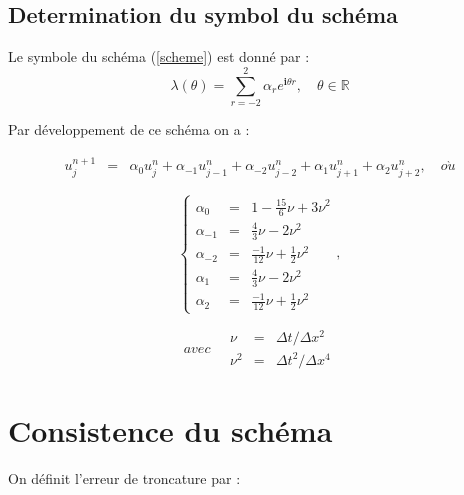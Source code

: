 \documentclass[a4paper,11pt]{article}
\begin{document}
\subsection{Determination du symbol du schéma}

Le symbole du schéma (\ref{scheme}) est donné par :
\begin{equation*}
\lambda(\theta) = \sum \limits_{r=-2}^{2} \alpha_{r} e^{\mathbf{i} \theta r}, \quad \theta \in \mathbb{R}
\end{equation*}

Par développement de ce schéma on a :

\begin{equation*}
    \begin{array}{rcl}
        u^{n+1}_{j} &=& \alpha_{0} u^{n}_{j} + \alpha_{-1} u^{n}_{j-1} + \alpha_{-2} u^{n}_{j-2} + \alpha_{1} u^{n}_{j+1}  + \alpha_{2} u^{n}_{j+2}, \quad o\grave{u}
    \end{array}
\end{equation*}

\begin{equation*}
    \left\{
    \begin{array}{rcl}
        \alpha_{0} &=& 1 - \scriptstyle \frac{15}{6} \nu + 3 \nu^{2} \\
        \alpha_{-1} &=& \scriptstyle \frac{4}{3} \nu - 2 \nu^{2} \\
        \alpha_{-2} &=& \scriptstyle \frac{-1}{12} \nu + \frac{1}{2} \nu^{2} \\
        \alpha_{1} &=& \scriptstyle \frac{4}{3} \nu - 2 \nu^{2} \\
        \alpha_{2} &=& \scriptstyle \frac{-1}{12} \nu + \frac{1}{2} \nu^{2}
    \end{array}
    \right.,
\end{equation*}

\begin{equation*}
    avec \quad
    \begin{array}{rcl}
        \nu &=& \Delta t/\Delta x^{2} \\
        \nu^{2} &=& \Delta t^{2}/\Delta x^{4}
    \end{array}
\end{equation*}


\section{Consistence du schéma}

On définit l'erreur de troncature par :
\end{document}
